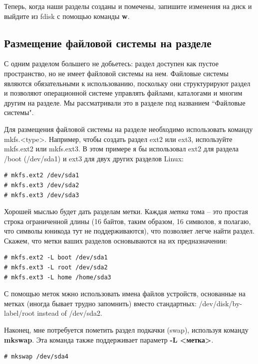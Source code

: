 \documentclass[10pt]{book}
\begin{document}
Теперь, когда наши разделы созданы и помечены, запишите изменения на диск и выйдите из fdisk с помощью команды \textbf{w}.

\subsection{Размещение файловой системы на разделе}

С одним разделом большего не добьетесь: раздел доступен как пустое пространство, но не имеет файловой системы на нем. Файловые системы являются обязательными к использованию, поскольку они структурируют раздел и позволяют операционной системе управлять файлами, каталогами и многим другим на разделе. Мы рассматривали это в разделе под названием “Файловые системы".

Для размещения файловой системы на разделе необходимо использовать команду mkfs.<type>. Например, чтобы создать раздел ext2 или ext3, используйте mkfs.ext2 или mkfs.ext3. В этом примере я бы использовал ext2 для раздела /boot (/dev/sda1) и ext3 для двух других разделов Linux:

\begin{tcolorbox} 
\begin{lstlisting}
# mkfs.ext2 /dev/sda1
# mkfs.ext3 /dev/sda2
# mkfs.ext3 /dev/sda3 
\end{lstlisting}
\end{tcolorbox}

Хорошей мыслью будет дать разделам метки. Каждая \textit{метка} тома -- это простая строка ограниченной длины (16 байтов, таким образом, 16 символов, я полагаю, что символы юникода тут не поддерживаются), что позволяет легче найти раздел. Скажем, что метки ваших разделов основываются на их предназначении: 
\begin{tcolorbox} 
\begin{lstlisting}
# mkfs.ext2 -L boot /dev/sda1
# mkfs.ext3 -L root /dev/sda2
# mkfs.ext3 -L home /home/sda3
\end{lstlisting}
\end{tcolorbox}

С помощью меток мжно использовать имена файлов устройств, основанные на метках (иногда бывает трудно запомнить) вместо стандартных: /dev/disk/by-label/root instead of /dev/sda2.

Наконец, мне потребуется пометить раздел подкачки (swap), используя команду \textbf{mkswap}. Эта команда также поддерживает параметр \textbf{-L <метка>}.

\begin{tcolorbox} 
\begin{lstlisting}
# mkswap /dev/sda4
\end{lstlisting}
\end{tcolorbox}
\end{document}

